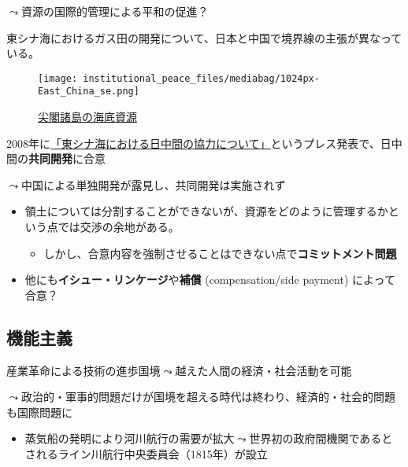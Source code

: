 \documentclass[
  xelatex,
  ja=standard]{bxjsarticle}
\providecommand{\tightlist}{%
  \setlength{\itemsep}{0pt}\setlength{\parskip}{0pt}}\usepackage{longtable,booktabs,array}
\begin{document}
\(\leadsto\)資源の国際的管理による平和の促進？

東シナ海におけるガス田の開発について、日本と中国で境界線の主張が異なっている。

\begin{figure}[htpb]

{\centering \texttt{[image: institutional\_peace\_files/mediabag/1024px-East\_China\_se.png]}

}

\caption{\href{https://commons.wikimedia.org/wiki/File:East_China_sea_digging_map.svg}{尖閣諸島の海底資源}}

\end{figure}

2008年に\href{https://www.mofa.go.jp/mofaj/area/china/higashi_shina/press.html}{「東シナ海における日中間の協力について」}というプレス発表で、日中間の\textbf{共同開発}に合意

\(\leadsto\)中国による単独開発が露見し、共同開発は実施されず

\begin{itemize}
\tightlist
\item
  領土については分割することができないが、資源をどのように管理するかという点では交渉の余地がある。

  \begin{itemize}
  \tightlist
  \item
    しかし、合意内容を強制させることはできない点で\textbf{コミットメント問題}
  \end{itemize}
\item
  他にも\textbf{イシュー・リンケージ}や\textbf{補償} (compensation/side
  payment) によって合意？
\end{itemize}

\hypertarget{ux6a5fux80fdux4e3bux7fa9}{%
\subsection{機能主義}\label{ux6a5fux80fdux4e3bux7fa9}}

産業革命による技術の進歩国境\(\leadsto\)越えた人間の経済・社会活動を可能

\(\leadsto\)政治的・軍事的問題だけが国境を超える時代は終わり、経済的・社会的問題も国際問題に

\begin{itemize}
\tightlist
\item
  蒸気船の発明により河川航行の需要が拡大\(\leadsto\)世界初の政府間機関であるとされるライン川航行中央委員会（1815年）が設立
\end{itemize}
\end{document}
